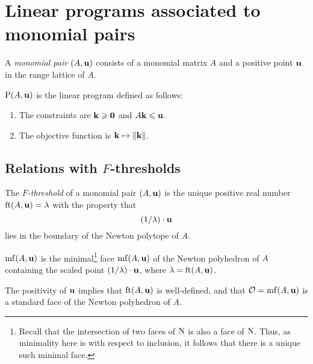 \documentclass[11pt]{amsart}
\begin{document}
\newpage



\section{Linear programs associated to monomial pairs}


\begin{definition}
A \emph{monomial pair} $(A, \mathbf{u})$ consists of a monomial matrix $A$ and a positive point $\mathbf{u}$ in the range lattice of $A$.
\end{definition}


\begin{definition}
$\mathrm{P}(A, \mathbf{u})$ is the linear program defined as follows:
\begin{enumerate}
\item The constraints are $\mathbf{k} \geqslant \mathbf{0}$ and $A \mathbf{k} \leqslant \mathbf{u}$.
\item The objective function is $\mathbf{k} \mapsto \| \mathbf{k} \|$.
\end{enumerate}
\end{definition}




\subsection{Relations with $F$-thresholds}
\label{opt sets: SS}

\begin{definition}
The \emph{$F$-threshold} of a monomial pair $(A, \mathbf{u})$ is the unique positive real number $\operatorname{ft}(A, \mathbf{u}) = \lambda$ with the property that  \[ (1/\lambda)  \cdot \mathbf{u}  \] 
lies in the boundary of the Newton polytope of $A$.  
\end{definition}

\begin{definition}
$\operatorname{mf}(A, \mathbf{u})$ is the minimal\footnote{Recall that the intersection of two faces of $\mathrm{N}$ is also a face of $\mathrm{N}$. Thus, as minimality here is with respect to inclusion, it follows that there is a unique such minimal face.} face $\operatorname{mf}(A, \mathbf{u})$ of the Newton polyhedron of $A$ containing the scaled point $(1/\lambda) \cdot \mathbf{u}$, where $\lambda = \operatorname{ft}(A, \mathbf{u})$.
\end{definition}


\begin{remark}  The positivity of $\mathbf{u}$ implies that $\operatorname{ft}(A, \mathbf{u})$ is well-defined, and that $\mathcal{O} = \operatorname{mf}(A, \mathbf{u})$ is a standard face of the Newton polyhedron of $A$.
\end{remark}
\end{document}
